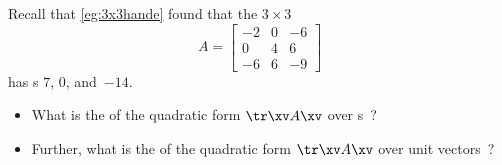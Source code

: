 \begin{activity}
Recall that \cref{eg:3x3hande} found that the \(3\times3\) 
\begin{equation*}
A=\begin{bmatrix} -2&0&-6\\0&4&6\\-6&6&-9 \end{bmatrix}
\end{equation*}
has s \(7\), \(0\), and~\(-14\).
\begin{itemize}
\item What is the  of the quadratic form \(\tr\xv A\xv\) over s~\xv?
\item Further, what is the  of the quadratic form \(\tr\xv A\xv\) over unit vectors~\xv?
\end{itemize}
\end{activity}



\begin{comment}
Could define positive/negative semi-definite forms/matrices.
But seems incidental so do not write yet.
\end{comment}




\begin{comment}  
Could have an optional application section on the following problem: useful whenever we can assess any pair of items, but do not have a framework for their absolute position.
Find \(m\) points in \(n\)D given that you know their distance
matrix and given that the mean location is precisely zero
\cite[p.83]{Hopcroft2014}. 
See \verb|multiDscaling.m|
\end{comment}







\sectionExercises


